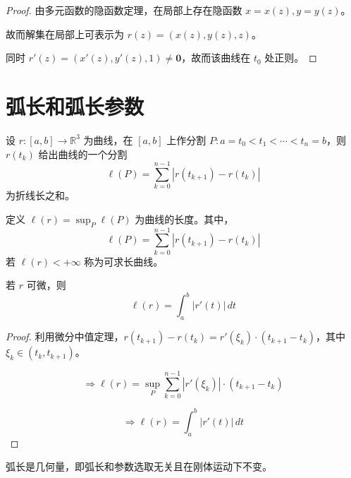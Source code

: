\documentclass[lang=cn,10pt,thmcnt=section]{elegantbook}
\renewcommand{\vec}[1]{\mathbf{#1}}
\begin{document}
\begin{proof}
由多元函数的隐函数定理，在局部上存在隐函数 $x = x(z), y = y(z)$。
 
故而解集在局部上可表示为 $r(z) = (x(z), y(z), z)$。

同时 $r'(z) = (x'(z), y'(z), 1) \neq \vec{0}$，故而该曲线在 $t_0$ 处正则。
\end{proof}
\section{弧长和弧长参数}
\begin{definition}[弧长]
    设 $r:[a,b] \rightarrow \mathbb{R}^3$ 为曲线，在 $[a,b]$ 上作分割 $P: a = t_0 < t_1 < \cdots < t_n = b$，则 $r(t_k)$ 给出曲线的一个分割
    \[
    \ell(P) = \sum_{k=0}^{n-1} |r(t_{k+1}) - r(t_k)|
    \]
    为折线长之和。
\end{definition}
\begin{definition}[曲线的弧长]
    定义 $\ell(r) = \sup_P \ell(P)$ 为曲线的长度。其中，
    \[
    \ell(P) = \sum_{k=0}^{n-1} |r(t_{k+1}) - r(t_k)|
    \]
    若 $\ell(r) < +\infty$ 称为可求长曲线。
    
    \begin{remark}
        若 $r$ 可微，则
    \[
    \ell(r) = \int_a^b |r'(t)| \, dt
    \]
    \end{remark}
    \end{definition}
    
\begin{proof}
    利用微分中值定理，$r(t_{k+1}) - r(t_k) = r'(\xi_k) \cdot (t_{k+1} - t_k)$，其中 $\xi_k \in (t_k, t_{k+1})$。
    
    \[
    \Rightarrow \ell(r) = \sup_P \sum_{k=0}^{n-1} |r'(\xi_k)| \cdot (t_{k+1} - t_k)
    \]
    
    \[
    \Rightarrow \ell(r) = \int_a^b |r'(t)| \, dt
    \]
\end{proof}
\begin{theorem}[弧长是几何量]
    弧长是几何量，即弧长和参数选取无关且在刚体运动下不变。
    \end{theorem}
    
\end{document}
